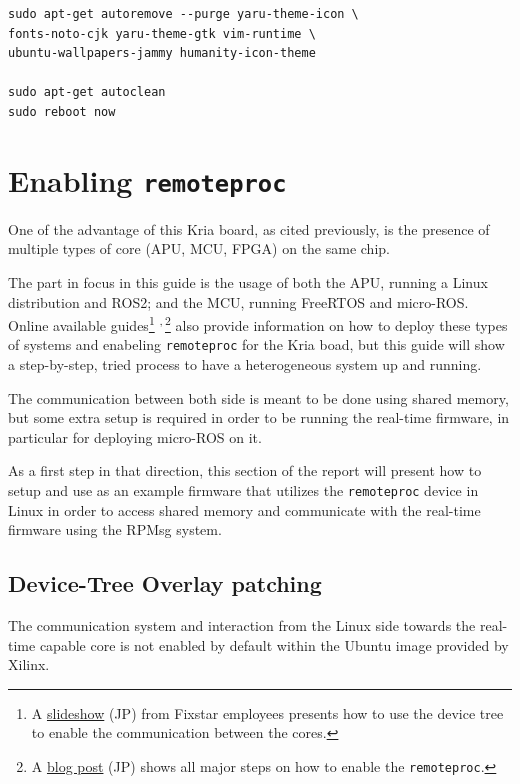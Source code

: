 \documentclass[10pt]{article}
\begin{document}
\begin{verbatim}
sudo apt-get autoremove --purge yaru-theme-icon \
fonts-noto-cjk yaru-theme-gtk vim-runtime \
ubuntu-wallpapers-jammy humanity-icon-theme

sudo apt-get autoclean
sudo reboot now
\end{verbatim}


\section{Enabling \texttt{remoteproc}}
\label{sec:org9ed7eeb}
One of the advantage of this Kria board, as cited previously, is the presence of
multiple types of core (APU, MCU, FPGA) on the same chip.

The part in focus in this guide is the usage of both the APU, running
a Linux distribution and ROS2; and the MCU, running FreeRTOS and micro-ROS.
Online available guides\footnote{A \href{https://speakerdeck.com/fixstars/fpga-seminar-12-fixstars-corporation-20220727}{slideshow} (JP) from Fixstar employees presents how to use the device
tree to enable the communication between the cores.} \textsuperscript{,}\,\footnote{A \href{https://zenn.dev/ryuz88/articles/kv260\_setup\_memo\_ubuntu22 }{blog post} (JP) shows all major steps on how to enable the \texttt{remoteproc}.} also provide information on how to deploy these types
of systems and enabeling \texttt{remoteproc} for the Kria boad, but this guide
will show a step-by-step, tried process to have a heterogeneous system
up and running.

The communication between both side is meant to be done using shared memory, but
some extra setup is required in order to be running the real-time firmware, in particular
for deploying micro-ROS on it.

As a first step in that direction, this section of the report
will present how to setup and use as an example firmware that utilizes the
\texttt{remoteproc} device in Linux in order to access shared memory
and communicate with the real-time firmware using the RPMsg system.

\subsection{Device-Tree Overlay patching}
\label{sec:org942c25c}
The communication system and interaction from the Linux side towards the real-time capable core
is not enabled by default within the Ubuntu image provided by Xilinx.
\end{document}
